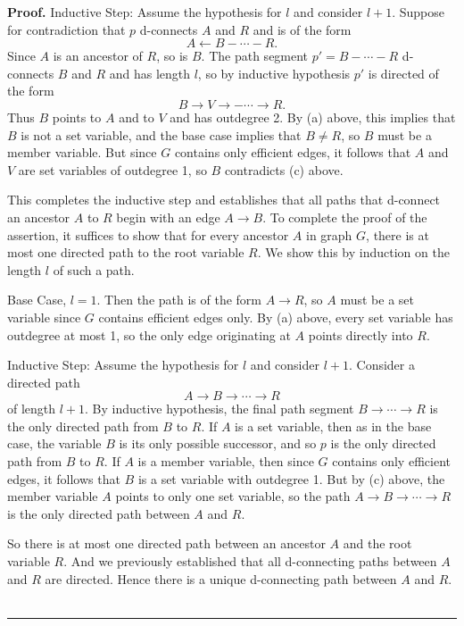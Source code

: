 \documentclass{elsarticle}%
\renewenvironment{proof}[1][Proof]{\noindent\textbf{#1.} }{\ \rule{0.5em}{0.5em}}
\newcommand{\A}{A}
\newcommand{\B}{B}
\newcommand{\R}{R}
\newcommand{\G}{G}
\begin{document}
\begin{proof}
Inductive Step: Assume the hypothesis for $l$ and consider $l +1$. Suppose for contradiction that $p$ d-connects $\A$ and $\R$ and is of the form $$\A \leftarrow \B - \cdots -\R.$$ Since $\A$ is an ancestor of $\R$, so is $\B$. The path segment $p' = \B- \cdots -\R$ d-connects $\B$ and $\R$ and has length $l$, so by inductive hypothesis $p'$ is directed of the form $$\B \rightarrow V \rightarrow - \cdots \rightarrow \R.$$ Thus $\B$ points to $\A$ and to $V$ and has outdegree 2. By (a) above, this implies that $\B$ is not a set variable, and the base case implies that $\B \neq \R$, so $\B$ must be a member variable. But since $\G$ contains only efficient edges, it follows that $\A$ and $V$ are set variables of outdegree 1, so $\B$ contradicts (c) above.

This completes the inductive step and establishes that all paths that d-connect an ancestor $\A$ to $\R$ begin with an edge $\A \rightarrow \B$. To complete the proof of the assertion, it suffices to show that for every ancestor $\A$ in graph $\G$, there is at most one directed path to the root variable $\R$. We show this by induction on the length $l$ of such a path.

Base Case, $l = 1$. Then the path is of the form $\A \rightarrow \R$, so $\A$ must be a set variable since $\G$ contains efficient edges only. By (a) above, every set variable has outdegree at most 1, so the only edge originating at $\A$ points directly into $\R$.

Inductive Step: Assume the hypothesis for $l$ and consider $l+1$. Consider a directed path  $$\A \rightarrow \B \rightarrow \cdots \rightarrow \R$$ of length $l+1$. By inductive hypothesis, the final path segment $\B \rightarrow \cdots \rightarrow \R$ is the only directed path from $\B$ to $\R$. If $\A$ is a set variable, then as in the base case, the variable $\B$ is its only possible successor, and so $p$ is the only directed path from $\B$ to $\R$. If $\A$ is a member variable, then since $\G$ contains only efficient edges, it follows that $\B$ is a set variable with outdegree 1. But by (c) above, the member variable $\A$ points to only one set variable, so the path $\A \rightarrow \B \rightarrow \cdots \rightarrow \R$ is the only directed path between $\A$ and $\R$.

So there is at most one directed path between an ancestor $\A$ and the root variable $\R$. And we previously established that all d-connecting paths between $\A$ and $\R$ are directed. Hence there is a unique d-connecting path between $\A$ and $\R$.
\end{proof}
\end{document}
